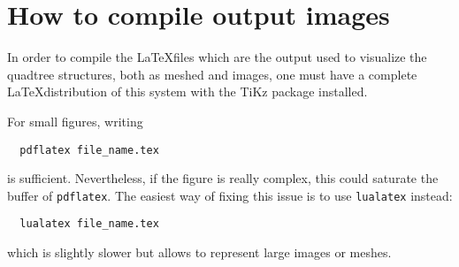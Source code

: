 \documentclass[a4paper,10pt]{article}
\begin{document}
\section{How to compile output images}
In order to compile the \LaTeX files which are the output used to visualize the quadtree structures, both as meshed and images, one must have a complete \LaTeX distribution of this system with the TiKz package installed.

For small figures, writing
\begin{center}
 \begin{verbatim}
  pdflatex file_name.tex
 \end{verbatim}
\end{center}
is sufficient. Nevertheless, if the figure is really complex, this could saturate the buffer of \texttt{pdflatex}. The easiest way of fixing this issue is to use \texttt{lualatex} instead:
\begin{center}
 \begin{verbatim}
  lualatex file_name.tex
 \end{verbatim}
\end{center}
which is slightly slower but allows to represent large images or meshes.
\end{document}
